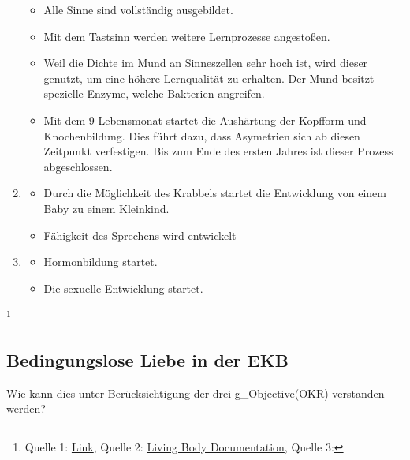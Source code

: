 \begin{enumerate}
	\begin{itemize}
		\item Alle Sinne sind vollständig ausgebildet.
		\item Mit dem Tastsinn werden weitere Lernprozesse angestoßen.
		\item Weil die Dichte im Mund an Sinneszellen sehr hoch ist, wird dieser genutzt, um eine höhere Lernqualität zu erhalten. Der Mund besitzt spezielle Enzyme, welche Bakterien angreifen.
		\item Mit dem 9 Lebensmonat startet die Aushärtung der Kopfform und Knochenbildung. Dies führt dazu, dass Asymetrien sich ab diesen Zeitpunkt verfestigen. Bis zum Ende des ersten Jahres ist dieser Prozess abgeschlossen.
	\end{itemize}
	\item[1 Jahr]
	\begin{itemize}
		\item Durch die Möglichkeit des Krabbels startet die Entwicklung von einem Baby zu einem Kleinkind.
		\item Fähigkeit des Sprechens wird entwickelt
	\end{itemize}
	\item[11 Jahre]
	\begin{itemize}
		\item Hormonbildung startet.
		\item Die sexuelle Entwicklung startet.
	\end{itemize}
\end{enumerate}
\footnote{
	Quelle 1: \href{https://www.ipzf.de/gehirnentwicklung.html}{Link},
	Quelle 2: \href{https://www.youtube.com/watch?v=ZNYv_ory8rc}{Living Body Documentation},
	Quelle 3: %
}

\subsection{Bedingungslose Liebe in der EKB} Wie kann dies unter Berücksichtigung der drei \gls{g_Objective(OKR)} verstanden werden?\\


